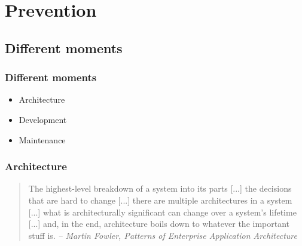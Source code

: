 \section{Prevention}

\subsection{Different moments}

\begin{frame}
\frametitle{Different moments}

\begin{itemize}
\Large
\item Architecture
\item Development
\item Maintenance
\end{itemize}
\end{frame}

\begin{frame}
\frametitle{Architecture}
\begin{quote}
\begin{small}
The {\large\color{emphasis} highest-level breakdown} of a system into its parts [...] the decisions that are
{\large\color{emphasis} hard to change} [...] there are multiple architectures in a system [...] what is
architecturally significant can change over a system's lifetime [...] and, in the
end, architecture boils down to whatever the {\large\color{emphasis} important stuff} is.
\newline \textit{-- Martin Fowler, Patterns of Enterprise Application Architecture}
\end{small}
\end{quote}
\end{frame}

